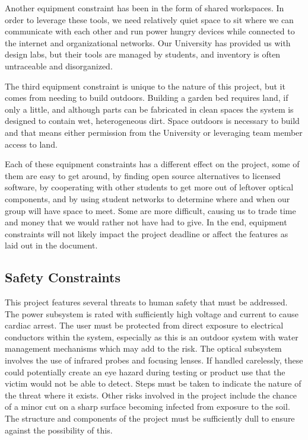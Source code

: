 Another equipment constraint has been in the form of shared workspaces. In order to leverage these tools, we need relatively quiet space to sit where we can communicate with each other and run power hungry devices while connected to the internet and organizational networks. Our University has provided us with design labs, but their tools are managed by students, and inventory is often untraceable and disorganized. 

The third equipment constraint is unique to the nature of this project, but it comes from needing to build outdoors. Building a garden bed requires land, if only a little, and although parts can be fabricated in clean spaces the system is designed to contain wet, heterogeneous dirt. Space outdoors is necessary to build and that means either permission from the University or leveraging team member access to land. 

Each of these equipment constraints has a different effect on the project, some of them are easy to get around, by finding open source alternatives to licensed software, by cooperating with other students to get more out of leftover optical components, and by using student networks to determine where and when our group will have space to meet. Some are more difficult, causing us to trade time and money that we would rather not have had to give. In the end, equipment constraints will not likely impact the project deadline or affect the features as laid out in the document.

\subsection{Safety Constraints}
This project features several threats to human safety that must be addressed. 
The power subsystem is rated with sufficiently high voltage and current to cause cardiac arrest. The user must be protected from direct exposure to electrical conductors within the system, especially as this is an outdoor system with water management mechanisms which may add to the risk. 
The optical subsystem involves the use of infrared probes and focusing lenses. If handled carelessly, these could potentially create an eye hazard during testing or product use that the victim would not be able to detect. Steps must be taken to indicate the nature of the threat where it exists. 
Other risks involved in the project include the chance of a minor cut on a sharp surface becoming infected from exposure to the soil. The structure and components of the project must be sufficiently dull to ensure against the possibility of this. 

